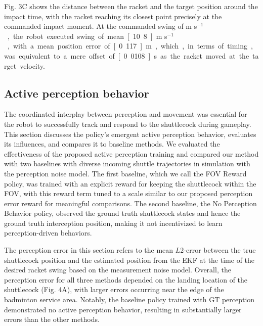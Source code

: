 \documentclass[9pt,twocolumn,twoside]{osajnl}
\begin{document}
Fig. 3C shows the distance between the racket and the target position around the impact time, with the racket reaching its closest point precisely at the commanded impact moment. At the commanded swing of \unit[12]{m  s$^{-1}$}, the robot executed swing of mean \unit[10.8]{m s$^{-1}$}, with a mean position error of \unit[0.117]{m}, which, in terms of timing, was equivalent to a mere offset of \unit[0.0108]{s} as the racket moved at the target velocity.

\subsection*{Active perception behavior}



The coordinated interplay between perception and movement was essential for the robot to successfully track and respond to the shuttlecock during gameplay. This section discusses the policy's emergent active perception behavior, evaluates its influences, and compares it to baseline methods. We evaluated the effectiveness of the proposed active perception training and compared our method with two baselines with diverse incoming shuttle trajectories in simulation with the perception noise model. The first baseline, which we call the \ac{FOV} Reward policy, was trained with an explicit reward for keeping the shuttlecock within the \ac{FOV}, with this reward term tuned to a scale similar to our proposed perception error reward for meaningful comparisons. The second baseline, the No Perception Behavior policy, observed the ground truth shuttlecock states and hence the ground truth interception position, making it not incentivized to learn perception-driven behaviors.

The perception error in this section refers to the mean $L2$-error between the true shuttlecock position and the estimated position from the \ac{EKF} at the time of the desired racket swing based on the measurement noise model. Overall, the perception error for all three methods depended on the landing location of the shuttlecock (Fig. 4A), with larger errors occurring near the edge of the badminton service area. Notably, the baseline policy trained with \ac{GT} perception demonstrated no active perception behavior, resulting in substantially larger errors than the other methods.
\end{document}
